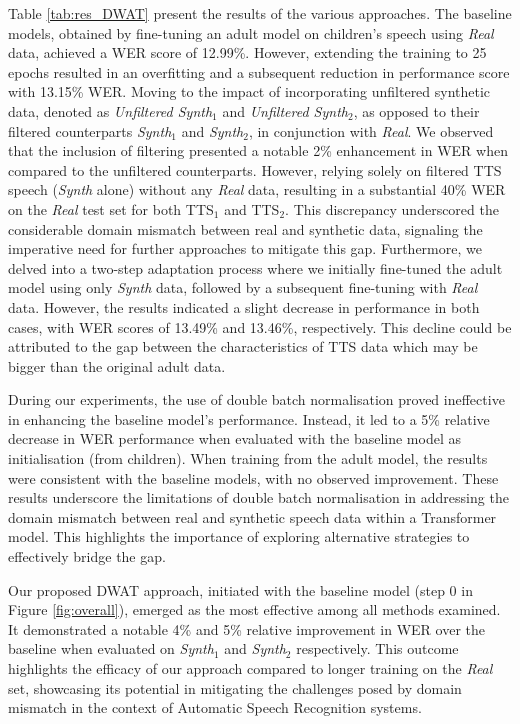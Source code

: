 Table \ref{tab:res_DWAT} present the results of the various approaches. The baseline models, obtained by fine-tuning an adult model on children's speech using \textit{Real} data, achieved a \ac{WER} score of 12.99\%. However, extending the training to 25 epochs resulted in an overfitting and a subsequent reduction in performance score with 13.15\% \ac{WER}.
Moving to the impact of incorporating unfiltered synthetic data, denoted as \textit{Unfiltered Synth$_1$} and \textit{Unfiltered Synth$_2$}, as opposed to their filtered counterparts \textit{Synth$_1$} and \textit{Synth$_2$}, in conjunction with \textit{Real}. We observed that the inclusion of filtering presented a notable 2\% enhancement in \ac{WER} when compared to the unfiltered counterparts. However, relying solely on filtered \ac{TTS} speech (\textit{Synth} alone) without any \textit{Real} data, resulting in a substantial 40\% \ac{WER} on the \textit{Real} test set for both TTS$_1$ and TTS$_2$. This discrepancy underscored the considerable domain mismatch between real and synthetic data, signaling the imperative need for further approaches to mitigate this gap.
Furthermore, we delved into a two-step adaptation process where we initially fine-tuned the adult model using only \textit{Synth} data, followed by a subsequent fine-tuning with \textit{Real} data. However, the results indicated a slight decrease in performance in both cases, with \ac{WER} scores of 13.49\% and 13.46\%, respectively. This decline could be attributed to the gap between the characteristics of \ac{TTS} data which may be bigger than the original adult data.

During our experiments, the use of double batch normalisation proved ineffective in enhancing the baseline model's performance. Instead, it led to a 5\% relative decrease in \ac{WER} performance when evaluated with the baseline model as initialisation (from children). When training from the adult model, the results were consistent  with the baseline models, with no observed improvement. These results underscore the limitations of double batch normalisation in addressing the domain mismatch between real and synthetic speech data within a Transformer model. This highlights the importance of exploring alternative strategies to effectively bridge the gap.

Our proposed \ac{DWAT} approach, initiated with the baseline model (step 0 in Figure \ref{fig:overall}), emerged as the most effective among all methods examined. It demonstrated a notable 4\% and 5\% relative improvement in \ac{WER} over the baseline when evaluated on \textit{Synth$_1$} and \textit{Synth$_2$} respectively. This outcome highlights the efficacy of our approach compared to longer training on the \textit{Real} set, showcasing its potential in mitigating the challenges posed by domain mismatch in the context of Automatic Speech Recognition systems.


